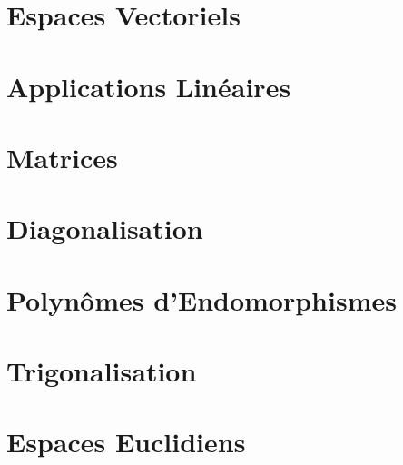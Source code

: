 



\chapter{Espaces Vectoriels}


\chapter{Applications Linéaires}


\chapter{Matrices}


\chapter{Diagonalisation}


\chapter{Polynômes d'Endomorphismes}


\chapter{Trigonalisation}


\chapter{Espaces Euclidiens}
